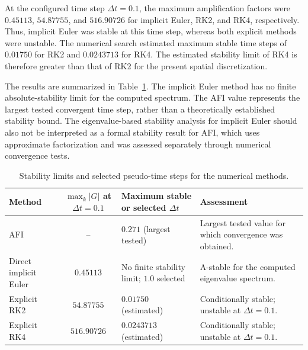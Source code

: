 At the configured time step $\Delta t=0.1$, the maximum
amplification factors were $0.45113$, $54.87755$, and
$516.90726$ for implicit Euler, RK2, and RK4, respectively.
Thus, implicit Euler was stable at this time step, whereas
both explicit methods were unstable. The numerical search
estimated maximum stable time steps of $0.01750$ for RK2
and $0.0243713$ for RK4. The estimated stability limit of
RK4 is therefore greater than that of RK2 for the present
spatial discretization.

The results are summarized in
Table~\ref{tab:maximum_timestep}. The implicit Euler method
has no finite absolute-stability limit for the computed
spectrum. The AFI value represents the largest tested
convergent time step, rather than a theoretically established
stability bound. The eigenvalue-based stability analysis
for implicit Euler should also not be interpreted as a
formal stability result for AFI, which uses approximate
factorization and was assessed separately through numerical
convergence tests.

\begin{table}[htbp]
    \centering
    \small
    \caption{Stability limits and selected pseudo-time steps
    for the numerical methods.}
    \label{tab:maximum_timestep}
    \begin{tabular}{@{}l c p{3.0cm} p{5.0cm}@{}}
        \hline
        Method
        & $\max_k |G|$ at $\Delta t=0.1$
        & Maximum stable or selected $\Delta t$
        & Assessment
        \\
        \hline
        AFI
        & --
        & $0.271$ (largest tested)
        & Largest tested value for which convergence was obtained.
        \\[0.1cm]
        Direct implicit Euler
        & $0.45113$
        & No finite stability limit; $1.0$ selected
        & A-stable for the computed eigenvalue spectrum.
        \\[0.1cm]
        Explicit RK2
        & $54.87755$
        & $0.01750$ (estimated)
        & Conditionally stable; unstable at $\Delta t=0.1$.
        \\[0.1cm]
        Explicit RK4
        & $516.90726$
        & $0.0243713$ (estimated)
        & Conditionally stable; unstable at $\Delta t=0.1$.
        \\
        \hline
    \end{tabular}
\end{table}

